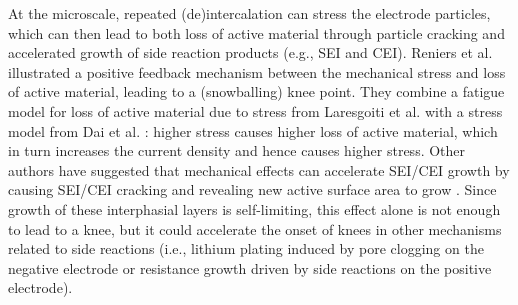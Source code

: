 \documentclass[journal=jpclcd,manuscript=article]{achemso}
\begin{document}
At the microscale, repeated (de)intercalation can stress the electrode particles, which can then lead to both loss of active material through particle cracking and accelerated growth of side reaction products (e.g., SEI and CEI).
Reniers et al. \cite{reniers_review_2019} illustrated a positive feedback mechanism between the mechanical stress and loss of active material, leading to a (snowballing) knee point. They combine a fatigue model for loss of active material due to stress from Laresgoiti et al. \cite{laresgoiti_modeling_2015} with a stress model from Dai et al. \cite{dai_simulation_2014}: higher stress causes higher loss of active material, which in turn increases the current density and hence causes higher stress.
Other authors have suggested that mechanical effects can accelerate SEI/CEI growth by causing SEI/CEI cracking and revealing new active surface area to grow \cite{pinson_theory_2013,kupper_end--life_2018,louli_operando_2019}. Since growth of these interphasial layers is self-limiting, this effect alone is not enough to lead to a knee, but it could accelerate the onset of knees in other mechanisms related to side reactions (i.e., lithium plating induced by pore clogging on the negative electrode \cite{lewerenz_post-mortem_2017} or resistance growth driven by side reactions on the positive electrode\cite{ma_editors_2019}).
\end{document}
